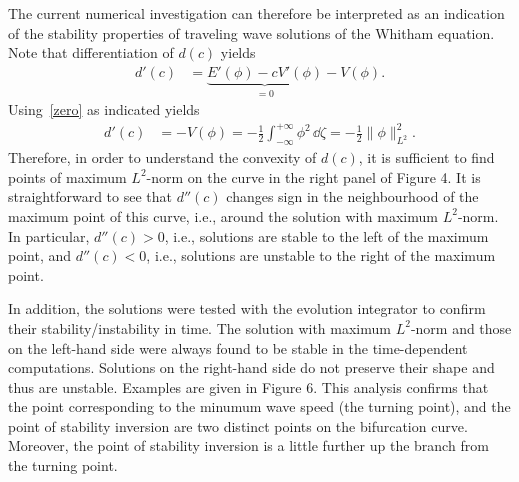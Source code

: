 The current numerical investigation can therefore be interpreted as an indication of the
stability properties of traveling wave solutions of the Whitham equation.
Note that differentiation of $d(c)$ yields
\begin{align*}
	d '(c) &= \underbrace{E'(\phi) - c V'(\phi)}_{=0} - V(\phi).
\end{align*}
Using~\eqref{zero} as indicated yields
\begin{align}
	d '(c) &= - V(\phi) = - \frac{1}{2} \int_{-\infty}^{+\infty} \phi ^2\,\dd\zeta = - \frac{1}{2}\|\phi\|_{L^2}^2 . 
\label{d'c}
\end{align}
Therefore, in order to understand the convexity of $d(c)$, it is sufficient
to find points of maximum $L^2$-norm on the curve in the right panel
of Figure 4.
It is straightforward to see that $d''(c)$ changes sign in the neighbourhood of the maximum point 
of this curve, i.e., around the solution with maximum $L^2$-norm. 
In particular, $d''(c) > 0$, i.e., solutions are stable to the left of the maximum point, 
and $d''(c) < 0$, i.e., solutions are unstable to the right of the maximum point.
	
In addition, the solutions were tested with the evolution integrator to confirm their stability/instability in time. 
The solution with maximum $L^2$-norm and those on the left-hand side were always found to be stable in 
the time-dependent computations.
Solutions on the right-hand side do not preserve their shape and thus are unstable. 
Examples are given in Figure 6. 
This analysis confirms that 
the point corresponding to the minumum wave speed (the turning point), 
and the point of stability inversion are two distinct points on the bifurcation curve.
Moreover, the point of stability inversion
is a little further up the branch from the turning point.






